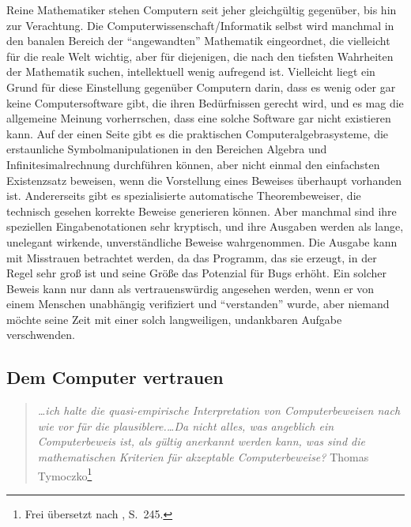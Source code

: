 Reine Mathematiker stehen Computern seit jeher gleichgültig gegenüber, bis hin zur Verachtung.  Die Computerwissenschaft/Informatik selbst wird manchmal in den banalen Bereich der "`angewandten"' Mathematik eingeordnet, die vielleicht für die reale Welt wichtig, aber für diejenigen, die nach den tiefsten Wahrheiten der Mathematik suchen, intellektuell wenig aufregend ist.  Vielleicht liegt ein Grund für diese Einstellung gegenüber Computern darin, dass es wenig oder gar keine Computersoftware gibt, die ihren Bedürfnissen gerecht wird, und es mag die allgemeine Meinung vorherrschen, dass eine solche Software gar nicht existieren kann.  Auf der einen Seite gibt es die praktischen Computeralgebrasysteme, die erstaunliche Symbolmanipulationen in den Bereichen Algebra und Infinitesimalrechnung durchführen können, aber nicht einmal den einfachsten Existenzsatz beweisen, wenn die Vorstellung eines Beweises überhaupt vorhanden ist.  Andererseits gibt es spezialisierte automatische Theorembeweiser, die technisch gesehen korrekte Beweise generieren können.  Aber manchmal sind ihre speziellen Eingabenotationen sehr kryptisch, und ihre Ausgaben werden als lange, unelegant wirkende, unverständliche Beweise wahrgenommen.
Die Ausgabe kann mit Misstrauen betrachtet werden, da das Programm, das sie erzeugt, in der Regel sehr groß ist und seine Größe das Potenzial für Bugs erhöht.
Ein solcher Beweis kann nur dann als vertrauenswürdig angesehen werden, wenn er von einem Menschen unabhängig verifiziert und "`verstanden"' wurde, aber niemand möchte seine Zeit mit einer solch langweiligen, undankbaren Aufgabe verschwenden.



\subsection{Dem Computer vertrauen}

\begin{quote}
  {\em \ldots ich halte die quasi-empirische Interpretation von Computerbeweisen nach wie vor für die plausiblere.\ldots Da nicht alles, was angeblich ein Computerbeweis ist, als gültig anerkannt werden kann, was sind die mathematischen Kriterien für akzeptable Computerbeweise?}
    \flushright\sc  Thomas Tymoczko\footnote{Frei übersetzt nach \cite{Tymoczko}, S.~245.}\\
\end{quote}

